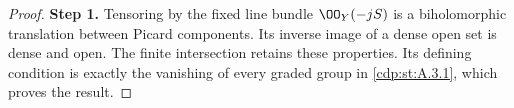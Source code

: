 \begin{proof}
\noindent\textbf{Step 1.} Tensoring by the fixed line bundle $\OO_Y(-jS)$ is a biholomorphic translation between Picard components. Its inverse image of a dense open set is dense and open. The finite intersection retains these properties. Its defining condition is exactly the vanishing of every graded group in \ref{cdp:st:A.3.1}, which proves the result.
\end{proof}
